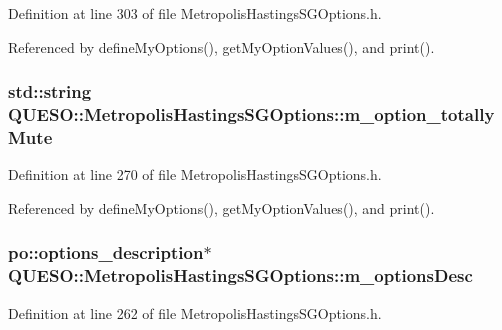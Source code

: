 Definition at line 303 of file Metropolis\-Hastings\-S\-G\-Options.\-h.



Referenced by define\-My\-Options(), get\-My\-Option\-Values(), and print().

\hypertarget{class_q_u_e_s_o_1_1_metropolis_hastings_s_g_options_adc30bd8388e2da2b063671fc5ccad850}{
\subsubsection[{m\-\_\-option\-\_\-totally\-Mute}]{\setlength{\rightskip}{0pt plus 5cm}std\-::string Q\-U\-E\-S\-O\-::\-Metropolis\-Hastings\-S\-G\-Options\-::m\-\_\-option\-\_\-totally\-Mute\hspace{0.3cm}{\ttfamily [private]}}}\label{class_q_u_e_s_o_1_1_metropolis_hastings_s_g_options_adc30bd8388e2da2b063671fc5ccad850}


Definition at line 270 of file Metropolis\-Hastings\-S\-G\-Options.\-h.



Referenced by define\-My\-Options(), get\-My\-Option\-Values(), and print().

\hypertarget{class_q_u_e_s_o_1_1_metropolis_hastings_s_g_options_a1a2cf22fbccd0bac761d9ee610edc16f}{
\subsubsection[{m\-\_\-options\-Desc}]{\setlength{\rightskip}{0pt plus 5cm}po\-::options\-\_\-description$\ast$ Q\-U\-E\-S\-O\-::\-Metropolis\-Hastings\-S\-G\-Options\-::m\-\_\-options\-Desc\hspace{0.3cm}{\ttfamily [private]}}}\label{class_q_u_e_s_o_1_1_metropolis_hastings_s_g_options_a1a2cf22fbccd0bac761d9ee610edc16f}


Definition at line 262 of file Metropolis\-Hastings\-S\-G\-Options.\-h.



